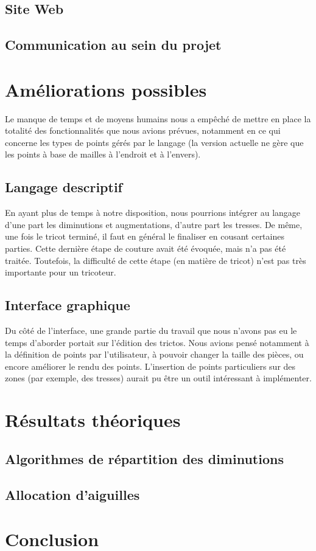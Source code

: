 \documentclass{article}
\begin{document}
\subsection{Site Web}

\subsection{Communication au sein du projet}

\section{Améliorations possibles}

Le manque de temps et de moyens humains nous a empêché de mettre en place la totalité des fonctionnalités que nous avions prévues, notamment en ce qui concerne les 
types de points gérés par le langage (la version actuelle ne gère que les points à base de mailles à l'endroit et à l'envers).

\subsection{Langage descriptif}
En ayant plus de temps à notre disposition, nous pourrions intégrer au langage d'une part les diminutions et augmentations, d'autre part les tresses. De même, une fois le tricot terminé, il faut en général le finaliser en cousant certaines parties. Cette dernière étape de couture avait été évoquée, mais n'a pas été traitée. Toutefois, la difficulté de cette étape (en matière de tricot) n'est pas très importante pour un tricoteur.

\subsection{Interface graphique}

Du côté de l'interface, une grande partie du travail que nous n'avons pas eu le temps d'aborder portait sur l'édition des trictos. Nous avions pensé notamment à la définition de points par l'utilisateur, à pouvoir changer la taille des pièces, ou encore améliorer le rendu des points. L'insertion de points particuliers sur des zones (par exemple, des tresses) aurait pu être un outil intéressant à implémenter.

\section{Résultats théoriques}

\subsection{Algorithmes de répartition des diminutions}

\subsection{Allocation d'aiguilles}

\section*{Conclusion}
\end{document}
